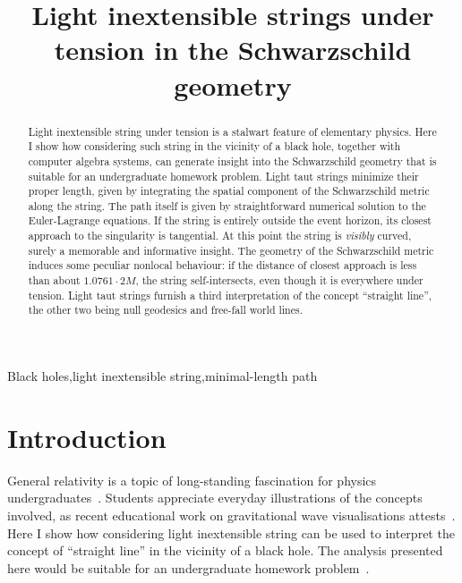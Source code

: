 \documentclass[review]{elsarticle}
\begin{document}
\begin{frontmatter}
\title{Light inextensible strings under tension in the Schwarzschild geometry}

\begin{abstract}

Light inextensible string under tension is a stalwart feature of
elementary physics.  Here I show how considering such string in the
vicinity of a black hole, together with computer algebra systems, can
generate insight into the Schwarzschild geometry that is suitable for
an undergraduate homework problem.  Light taut strings minimize their
proper length, given by integrating the spatial component of the
Schwarzschild metric along the string.  The path itself is given by
straightforward numerical solution to the Euler-Lagrange equations.
If the string is entirely outside the event horizon, its closest
approach to the singularity is tangential.  At this point the string
is {\em visibly} curved, surely a memorable and informative insight.
The geometry of the Schwarzschild metric induces some peculiar
nonlocal behaviour: if the distance of closest approach is less than
about $1.0761\cdot 2M$, the string self-intersects, even though it is
everywhere under tension.  Light taut strings furnish a third
interpretation of the concept ``straight line'', the other two being
null geodesics and free-fall world lines.


\end{abstract}

\begin{keyword}
Black holes\sep light inextensible string\sep minimal-length path
\end{keyword}

\end{frontmatter}

\linenumbers
\section{Introduction}

General relativity is a topic of long-standing fascination for physics
undergraduates~\cite{christensen2012}.  Students appreciate everyday
illustrations of the concepts involved, as recent educational work on
gravitational wave visualisations attests~\cite{overduin2018}.  Here I
show how considering light inextensible string can be used to
interpret the concept of ``straight line'' in the vicinity of a black
hole.  The analysis presented here would be suitable for an
undergraduate homework problem~\cite{romano2019}.
\end{document}
